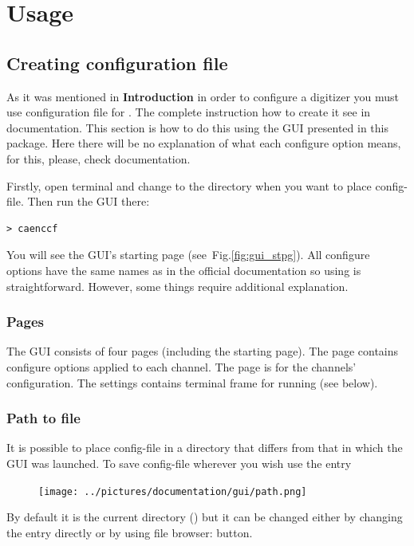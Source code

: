 \section{Usage}
\subsection{Creating configuration file}
As it was mentioned in \textbf{Introduction} in order to configure a digitizer you must
use configuration file for . The complete instruction how to create it see in
 documentation. This section is how to do this using the GUI presented in this
package. Here there will be no explanation of what each configure option means, for this,
please, check  documentation.

Firstly, open terminal and change to the directory when you want to place config-file.
Then run the GUI there:
\begin{lstlisting}
> caenccf
\end{lstlisting}
You will see the GUI's starting page (see~Fig.\ref{fig:gui_stpg}).
All configure options have the same names as in the official  documentation so
using is straightforward. However, some things require additional explanation. 
\subsubsection*{Pages}
The GUI consists of four pages (including the starting page). The 
page contains configure options applied to each channel. The 
page is for the channels' configuration. The  settings contains terminal
frame for running  (see below).
\subsubsection*{Path to file}
It is possible to place config-file in a directory that differs from that in which the
GUI was launched. To save config-file wherever you wish use the  entry

\begin{figure}[H]
    \centering
    \texttt{[image: ../pictures/documentation/gui/path.png]}
\end{figure}

By default it is the current directory () but it can be changed either by
changing the entry directly or by using file browser:   button.

